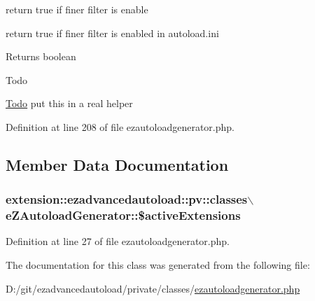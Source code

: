 return true if finer filter is enable 

return true if finer filter is enabled in autoload.\-ini

\begin{DoxyReturn}{\-Returns}
boolean
\end{DoxyReturn}
\begin{DoxyRefDesc}{\-Todo}
\item[\hyperlink{todo__todo000001}{\-Todo}]put this in a real helper \end{DoxyRefDesc}


\-Definition at line 208 of file ezautoloadgenerator.\-php.



\subsection{\-Member \-Data \-Documentation}
\hypertarget{classextension_1_1ezadvancedautoload_1_1pv_1_1classes_1_1e_z_autoload_generator_a600be69823d714cae92e7e3e3f4ad87b}{
\subsubsection[{\$active\-Extensions}]{\setlength{\rightskip}{0pt plus 5cm}extension\-::ezadvancedautoload\-::pv\-::classes$\backslash$e\-Z\-Autoload\-Generator\-::\$active\-Extensions}}\label{classextension_1_1ezadvancedautoload_1_1pv_1_1classes_1_1e_z_autoload_generator_a600be69823d714cae92e7e3e3f4ad87b}


\-Definition at line 27 of file ezautoloadgenerator.\-php.



\-The documentation for this class was generated from the following file\-:\begin{DoxyCompactItemize}
\item 
\-D\-:/git/ezadvancedautoload/private/classes/\hyperlink{ezautoloadgenerator_8php}{ezautoloadgenerator.\-php}\end{DoxyCompactItemize}
